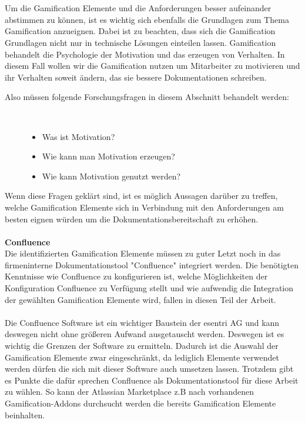 \documentclass[a4paper,12pt]{scrartcl}
\begin{document}
\\\\
Um die Gamification Elemente und die Anforderungen besser aufeinander abstimmen zu können, ist es wichtig sich ebenfalls die Grundlagen zum Thema Gamification anzueignen. Dabei ist zu beachten, dass sich die Gamification Grundlagen nicht nur in technische Lösungen einteilen lassen. Gamification behandelt die Psychologie der Motivation und das erzeugen von Verhalten. In diesem Fall wollen wir die Gamification nutzen um Mitarbeiter zu motivieren und ihr Verhalten soweit ändern, das sie bessere Dokumentationen schreiben.
\begin{description}
   \item[Also müssen folgende Forschungsfragen in diesem Abschnitt behandelt werden:]~\par
   \begin{itemize}
      \item Was ist Motivation?
      \item Wie kann man Motivation erzeugen?
      \item Wie kann Motivation genutzt werden?
   \end{itemize}
\end{description}
Wenn diese Fragen geklärt sind, ist es möglich Aussagen darüber zu treffen, welche Gamification Elemente sich in Verbindung mit den Anforderungen am besten eignen würden um die Dokumentationsbereitschaft zu erhöhen.
\\\\
\textbf{Confluence}\\
Die identifizierten Gamification Elemente müssen zu guter Letzt noch in das firmeninterne Dokumentationstool "Confluence" integriert werden. Die benötigten Kenntnisse wie Confluence zu konfigurieren ist, welche Möglichkeiten der Konfiguration Confluence zu Verfügung stellt und wie aufwendig die Integration der gewählten Gamification Elemente wird, fallen in diesen Teil der Arbeit. 
\\\\
Die Confluence Software ist ein wichtiger Baustein der esentri AG und kann deswegen nicht ohne größeren Aufwand ausgetauscht werden. Deswegen ist es wichtig die Grenzen der Software zu ermitteln. Dadurch ist die Auswahl der Gamification Elemente zwar eingeschränkt, da lediglich Elemente verwendet werden dürfen die sich mit dieser Software auch umsetzen lassen. Trotzdem gibt es Punkte die dafür sprechen Confluence als Dokumentationstool für diese Arbeit zu wählen. So kann der Atlassian Marketplace z.B nach vorhandenen Gamification-Addons durchsucht werden die bereits Gamification Elemente beinhalten.
\end{document}
